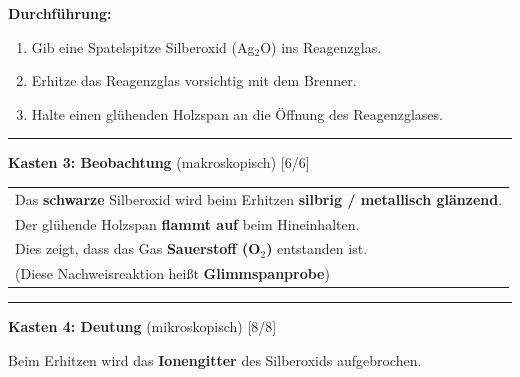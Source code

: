 \documentclass[10pt, a4paper]{article}
\newcommand{\lsg}[1]{\textcolor{loesung}{\textbf{#1}}}
\newcommand{\punktebox}[1]{\hfill\small\textcolor{mittelgrau}{[#1/#1]}}
\begin{document}
\begin{versuchsbox}

\textbf{Durchführung:}
\begin{enumerate}[leftmargin=2em, itemsep=1pt]
    \item Gib eine Spatelspitze Silberoxid (Ag$_2$O) ins Reagenzglas.
    \item Erhitze das Reagenzglas vorsichtig mit dem Brenner.
    \item Halte einen glühenden Holzspan an die Öffnung des Reagenzglases.
\end{enumerate}

\vspace{6pt}
\hrule
\vspace{6pt}


\textbf{Kasten 3: Beobachtung} (makroskopisch) \punktebox{6}

\vspace{4pt}

\vspace{4pt}
\begin{tabular}{@{}p{14cm}@{}}
Das \textbf{schwarze} Silberoxid wird beim Erhitzen \lsg{silbrig / metallisch glänzend}.\\[0.8em]
Der glühende Holzspan \lsg{flammt auf} beim Hineinhalten.\\[0.8em]
Dies zeigt, dass das Gas \lsg{Sauerstoff (O$_2$)} entstanden ist. \\[0.3em]
{\small (Diese Nachweisreaktion heißt \lsg{Glimmspanprobe})}
\end{tabular}

\vspace{6pt}
\hrule
\vspace{6pt}


\textbf{Kasten 4: Deutung} (mikroskopisch) \punktebox{8}

\vspace{4pt}

\begin{minipage}[t]{0.55\textwidth}

\vspace{4pt}
Beim Erhitzen wird das \lsg{Ionengitter} des Silberoxids aufgebrochen.\\[0.8em]


\end{minipage}
\end{versuchsbox}
\end{document}
